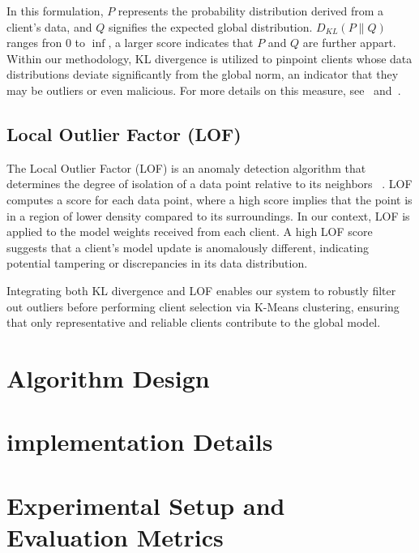 In this formulation, \(P\) represents the probability distribution derived from
a client's data, and \(Q\) signifies the expected global distribution.
\(D_{KL}(P \parallel Q)\) ranges fron 0 to \(\inf\), a larger score indicates
that \(P\) and \(Q\) are further appart. Within our methodology, KL divergence
is utilized to pinpoint clients whose data distributions deviate significantly
from the global norm, an indicator that they may be outliers or even malicious.
For more details on this measure, see~\cite{cover1991elements}
and~\cite{mcdonald2016measure}.

\subsection{Local Outlier Factor (LOF)}
The Local Outlier Factor (LOF) is an anomaly detection algorithm that
determines the degree of isolation of a data point relative to its neighbors
~\cite{breunig2000lof}. LOF computes a score for each data point, where a high
score implies that the point is in a region of lower density compared to its
surroundings. In our context, LOF is applied to the model weights received from
each client. A high LOF score suggests that a client's model update is
anomalously different, indicating potential tampering or discrepancies in its
data distribution.

Integrating both KL divergence and LOF enables our system to robustly filter
out outliers before performing client selection via K-Means clustering,
ensuring that only representative and reliable clients contribute to the global
model.
\section{Algorithm Design}

\section{implementation Details}

\section{Experimental Setup and Evaluation Metrics}


